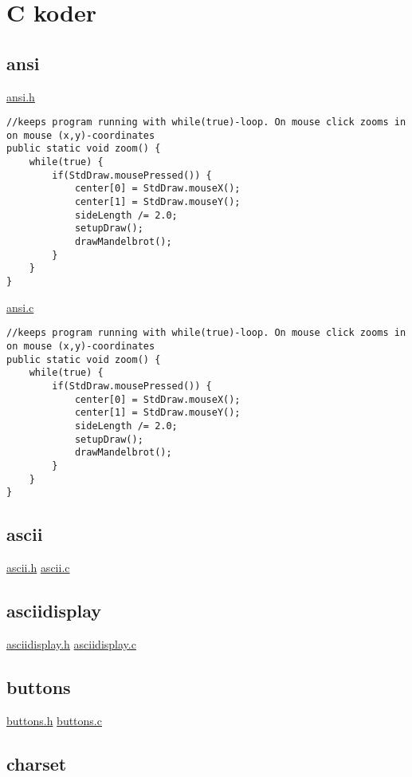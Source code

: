 \chapter{C koder}

\section{ansi}
\label{ansi}

\underline{ansi.h}
\begin{lstlisting}
//keeps program running with while(true)-loop. On mouse click zooms in on mouse (x,y)-coordinates
public static void zoom() {
	while(true) {
		if(StdDraw.mousePressed()) {
			center[0] = StdDraw.mouseX();
			center[1] = StdDraw.mouseY();
			sideLength /= 2.0;
			setupDraw();
			drawMandelbrot();
		}
	}
}
\end{lstlisting}

\underline{ansi.c}
\begin{lstlisting}
//keeps program running with while(true)-loop. On mouse click zooms in on mouse (x,y)-coordinates
public static void zoom() {
	while(true) {
		if(StdDraw.mousePressed()) {
			center[0] = StdDraw.mouseX();
			center[1] = StdDraw.mouseY();
			sideLength /= 2.0;
			setupDraw();
			drawMandelbrot();
		}
	}
}
\end{lstlisting}


\section{ascii}
\label{ascii}

\underline{ascii.h}
\underline{ascii.c}

\section{asciidisplay}
\label{asciidisplay}

\underline{asciidisplay.h}
\underline{asciidisplay.c}

\section{buttons}
\label{buttons}

\underline{buttons.h}
\underline{buttons.c}

\section{charset}
\label{charset}

